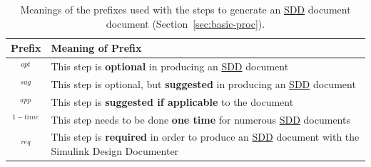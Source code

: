 \documentclass{mcscert}
\newcommand{\sddtool}{Simulink Design Documenter}
\begin{document}
\begin{center}
	\begin{table}
		\begin{tabular}{|c|p{}|} \hline
			\rule{0pt}{3ex} \textbf{Prefix} & \textbf{Meaning of Prefix} \\ \hline 
			\rule{0pt}{3ex} $^{opt}$ & This step is \textbf{optional} in producing an \hyperref[acr:sdd]{SDD} document \\ \hline
			\rule{0pt}{3ex} $^{sug}$ & This step is optional, but \textbf{suggested} in producing an \hyperref[acr:sdd]{SDD} document \\ \hline
			\rule{0pt}{3ex} $^{app}$ & This step is \textbf{suggested if applicable} to the document \\ \hline
			\rule{0pt}{3ex} $^{1-time}$ & This step needs to be done \textbf{one time} for numerous \hyperref[acr:sdd]{SDD} documents \\ \hline
			\rule{0pt}{3ex} $^{req}$ & This step is \textbf{required} in order to produce an \hyperref[acr:sdd]{SDD} document with the \sddtool{} \\ \hline
		\end{tabular}
		\caption{Meanings of the prefixes used with the steps to generate an \hyperref[acr:sdd]{SDD} document document (Section~\ref{sec:basic-proc}).}
		\label{tab:stepPrefixes}
	\end{table}
\end{center}
   
\end{document}
